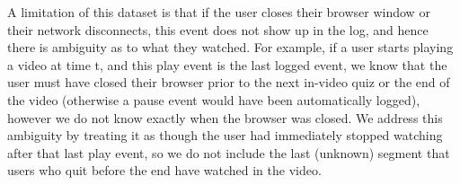 \documentclass{sigchi}
\begin{document}
A limitation of this dataset is that if the user closes their browser window or their network disconnects, this event does not show up in the log, and hence there is ambiguity as to what they watched. For example, if a user starts playing a video at time t, and this play event is the last logged event, we know that the user must have closed their browser prior to the next in-video quiz or the end of the video (otherwise a pause event would have been automatically logged), however we do not know exactly when the browser was closed. We address this ambiguity by treating it as though the user had immediately stopped watching after that last play event, so we do not include the last (unknown) segment that users who quit before the end have watched in the video.





\end{document}
